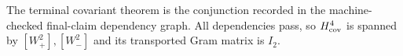 \begin{proposition}
The terminal covariant theorem is the conjunction recorded in the
machine-checked final-claim dependency graph.
All dependencies pass, so $H^4_{\rm cov}$ is spanned by
$[W_+^2],[W_-^2]$ and its transported Gram matrix is $I_2$.
\end{proposition}
